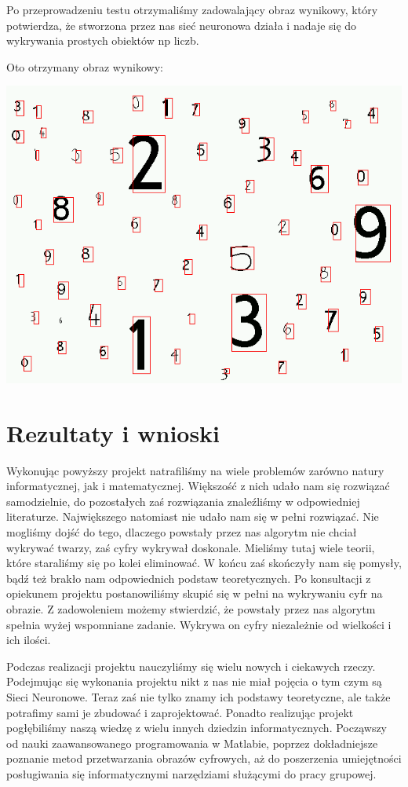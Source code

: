 \documentclass[11pt,a4paper]{article}
\begin{document}
Po przeprowadzeniu testu otrzymaliśmy zadowalający obraz wynikowy, który potwierdza, że stworzona przez nas 
sieć neuronowa działa i nadaje się do wykrywania prostych obiektów np liczb.

Oto otrzymany obraz wynikowy:

\begin{center}
\includegraphics[scale=0.35]{wynik}
\end{center}

\newpage
\section{Rezultaty i wnioski}
Wykonując powyższy projekt natrafiliśmy na wiele problemów zarówno natury informatycznej, jak i matematycznej.
Większość z nich udało nam się rozwiązać samodzielnie, do pozostałych zaś rozwiązania znaleźliśmy w odpowiedniej
literaturze. Największego natomiast nie udało nam się w pełni rozwiązać. Nie mogliśmy dojść do tego, dlaczego
powstały przez nas algorytm nie chciał wykrywać twarzy, zaś cyfry wykrywał doskonale. Mieliśmy tutaj wiele teorii, 
które staraliśmy się po kolei eliminować. W końcu zaś skończyły nam się pomysły, bądź też brakło nam odpowiednich 
podstaw teoretycznych. Po konsultacji z opiekunem projektu postanowiliśmy skupić się w pełni na wykrywaniu cyfr na obrazie.
Z zadowoleniem możemy stwierdzić, że powstały przez nas algorytm  spełnia wyżej wspomniane zadanie.
Wykrywa on cyfry niezależnie od wielkości i ich ilości. 

Podczas realizacji projektu nauczyliśmy się wielu nowych i ciekawych rzeczy. Podejmując się wykonania projektu nikt
z nas nie miał pojęcia o tym czym są Sieci Neuronowe. Teraz zaś nie tylko znamy ich podstawy teoretyczne, ale także
potrafimy sami je zbudować i zaprojektować. Ponadto realizując projekt pogłębiliśmy naszą wiedzę z wielu innych dziedzin
informatycznych. Począwszy od nauki zaawansowanego programowania w Matlabie,
poprzez dokładniejsze poznanie metod przetwarzania obrazów cyfrowych, aż do poszerzenia umiejętności posługiwania się
informatycznymi narzędziami służącymi do pracy grupowej. 
\end{document}
